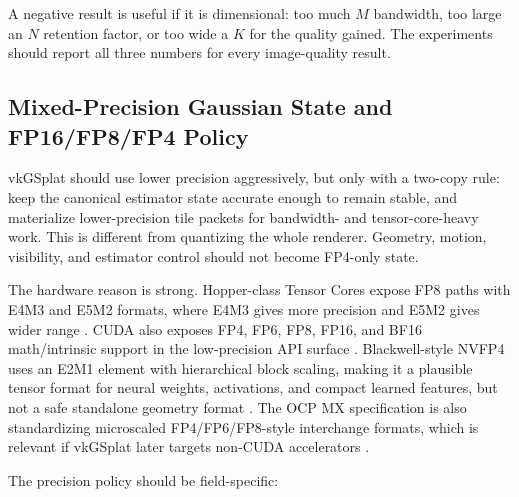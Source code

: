 \documentclass[11pt]{article}
\begin{document}
A negative result is useful if it is dimensional: too much $M$ bandwidth, too
large an $N$ retention factor, or too wide a $K$ for the quality gained. The
experiments should report all three numbers for every image-quality result.

\subsection{Mixed-Precision Gaussian State and FP16/FP8/FP4 Policy}

vkGSplat should use lower precision aggressively, but only with a two-copy
rule: keep the canonical estimator state accurate enough to remain stable, and
materialize lower-precision tile packets for bandwidth- and tensor-core-heavy
work. This is different from quantizing the whole renderer. Geometry, motion,
visibility, and estimator control should not become FP4-only state.

The hardware reason is strong. Hopper-class Tensor Cores expose FP8 paths with
E4M3 and E5M2 formats, where E4M3 gives more precision and E5M2 gives wider
range \cite{nvidia2022hopper,nvidia2026transformerenginefp8}. CUDA also exposes
FP4, FP6, FP8, FP16, and BF16 math/intrinsic support in the low-precision API
surface \cite{nvidia2026cudamath}. Blackwell-style NVFP4 uses an E2M1 element
with hierarchical block scaling, making it a plausible tensor format for
neural weights, activations, and compact learned features, but not a safe
standalone geometry format \cite{nvidia2026nvfp4}. The OCP MX specification is
also standardizing microscaled FP4/FP6/FP8-style interchange formats, which is
relevant if vkGSplat later targets non-CUDA accelerators \cite{ocp2026mx}.

The precision policy should be field-specific:
\end{document}
